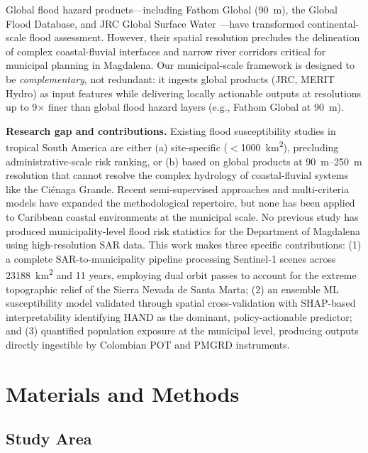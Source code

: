 \documentclass{article}
\begin{document}
Global flood hazard products---including Fathom Global (\SI{90}{\metre}), the Global Flood Database, and JRC Global Surface Water \citep{Pekel2016}---have transformed continental-scale flood assessment. However, their spatial resolution precludes the delineation of complex coastal-fluvial interfaces and narrow river corridors critical for municipal planning in Magdalena. Our municipal-scale framework is designed to be \textit{complementary}, not redundant: it ingests global products (JRC, MERIT Hydro) as input features while delivering locally actionable outputs at resolutions up to 9$\times$ finer than global flood hazard layers (e.g., Fathom Global at \SI{90}{\metre}).

\textbf{Research gap and contributions.} Existing flood susceptibility studies in tropical South America are either (a) site-specific ($<$\SI{1000}{\kilo\metre\squared}), precluding administrative-scale risk ranking, or (b) based on global products at \SI{90}{\metre}--\SI{250}{\metre} resolution that cannot resolve the complex hydrology of coastal-fluvial systems like the Ci\'enaga Grande. Recent semi-supervised approaches \citep{Zhao2019} and multi-criteria models \citep{Tien2016} have expanded the methodological repertoire, but none has been applied to Caribbean coastal environments at the municipal scale. No previous study has produced municipality-level flood risk statistics for the Department of Magdalena using high-resolution SAR data. This work makes three specific contributions: (1) a complete SAR-to-municipality pipeline processing Sentinel-1 scenes across \SI{23188}{\kilo\metre\squared} and 11 years, employing dual orbit passes to account for the extreme topographic relief of the Sierra Nevada de Santa Marta; (2) an ensemble ML susceptibility model validated through spatial cross-validation with SHAP-based interpretability identifying HAND as the dominant, policy-actionable predictor; and (3) quantified population exposure at the municipal level, producing outputs directly ingestible by Colombian POT and PMGRD instruments.

\section{Materials and Methods}
\label{sec:methods}

\subsection{Study Area}
\label{sec:study_area}
\end{document}
